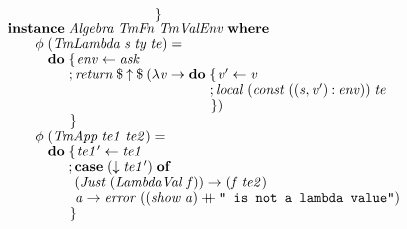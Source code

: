 \documentclass[10pt]{article}
\newcommand{\Conid}[1]{\mathit{#1}}
\newcommand{\Varid}[1]{\mathit{#1}}
\newcommand{\plus}{\mathbin{+\!\!\!+}}
\begin{document}
\begin{tabbing}
${\hskip1.00em\relax\hskip2.00em\relax\phantom{\Varid{\phi}\;(\Conid{TmVar}\;\Varid{v})\mathrel{=}\mathbf{do}\;\mbox{}}\mskip1.5mu\}}$\\
${}$\\
${\hskip1.00em\relax\mathbf{instance}\;\Conid{Algebra}\;\Conid{TmFn}\;\Conid{TmValEnv}\;\mathbf{where}}$\\
${\hskip1.00em\relax\hskip2.00em\relax\Varid{\phi}\;(\Conid{TmLambda}\;\Varid{s}\;\Varid{ty}\;\Varid{te})\mathrel{=}}$\\
${\hskip1.00em\relax\hskip2.00em\relax\phantom{\Varid{\phi}\;\mbox{}}\mathbf{do}\;\{\mskip1.5mu \Varid{env}\leftarrow \Varid{ask}}$\\
${\hskip1.00em\relax\hskip2.00em\relax\phantom{\Varid{\phi}\;\mbox{}}\phantom{\mathbf{do}\;\mbox{}};\Varid{return}\mathbin{\$}\Varid{\uparrow}\mathbin{\$}(\lambda \Varid{v}\to \mathbf{do}\;\{\mskip1.5mu \Varid{v'}\leftarrow \Varid{v}}$\\
${\hskip1.00em\relax\hskip2.00em\relax\phantom{\Varid{\phi}\;\mbox{}}\phantom{\mathbf{do}\;\mbox{}}\phantom{;\Varid{return}\mathbin{\$}\Varid{\uparrow}\mathbin{\$}(\lambda \Varid{v}\to \mathbf{do}\;\mbox{}};\Varid{local}\;(\Varid{const}\;((\Varid{s},\Varid{v'})\mathbin{:}\Varid{env}))\;\Varid{te}}$\\
${\hskip1.00em\relax\hskip2.00em\relax\phantom{\Varid{\phi}\;\mbox{}}\phantom{\mathbf{do}\;\mbox{}}\phantom{;\Varid{return}\mathbin{\$}\Varid{\uparrow}\mathbin{\$}(\lambda \Varid{v}\to \mathbf{do}\;\mbox{}}\mskip1.5mu\})}$\\
${\hskip1.00em\relax\hskip2.00em\relax\phantom{\Varid{\phi}\;\mbox{}}\phantom{\mathbf{do}\;\mbox{}}\mskip1.5mu\}}$\\
${\hskip1.00em\relax\hskip2.00em\relax\Varid{\phi}\;(\Conid{TmApp}\;\Varid{te1}\;\Varid{te2})\mathrel{=}}$\\
${\hskip1.00em\relax\hskip2.00em\relax\phantom{\Varid{\phi}\;\mbox{}}\mathbf{do}\;\{\mskip1.5mu \Varid{te1'}\leftarrow \Varid{te1}}$\\
${\hskip1.00em\relax\hskip2.00em\relax\phantom{\Varid{\phi}\;\mbox{}}\phantom{\mathbf{do}\;\mbox{}};\mathbf{case}\;(\Varid{\downarrow}\;\Varid{te1'})\;\mathbf{of}}$\\
${\hskip1.00em\relax\hskip2.00em\relax\phantom{\Varid{\phi}\;\mbox{}}\phantom{\mathbf{do}\;\mbox{}}\phantom{;\mbox{}}(\Conid{Just}\;(\Conid{LambdaVal}\;\Varid{f}))\to (\Varid{f}\;\Varid{te2})}$\\
${\hskip1.00em\relax\hskip2.00em\relax\phantom{\Varid{\phi}\;\mbox{}}\phantom{\mathbf{do}\;\mbox{}}\phantom{;\mbox{}}\Varid{a}\to \Varid{error}\;((\Varid{show}\;\Varid{a})\plus \text{\tt \char34 ~is~not~a~lambda~value\char34})}$\\
${\hskip1.00em\relax\hskip2.00em\relax\phantom{\Varid{\phi}\;\mbox{}}\phantom{\mathbf{do}\;\mbox{}}\mskip1.5mu\}}$
\end{tabbing}
\end{document}
